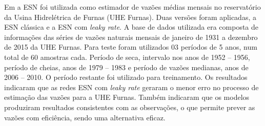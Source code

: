 
Em  a ESN foi utilizada como estimador de vazões médias mensais no reservatório da Usina Hidrelétrica de Furnas (UHE Furnas). Duas versões foram aplicadas, a ESN clássica e a ESN com \textit{leaky rate}. A base de dados utilizada era composta de informações das séries de vazões naturais mensais de janeiro de 1931 a dezembro de 2015 da UHE Furnas. Para teste foram utilizados 03 períodos de 5 anos, num total de 60 amostras cada. Período de seca, intervalo nos anos de 1952 -- 1956, período de cheias, anos de 1979 -- 1983 e período de vazões medianas, anos de 2006 -- 2010. O período restante foi utilizado para treinamento. Os resultados indicaram que as redes ESN com \textit{leaky rate} geraram o menor erro no processo de estimação das vazões para a UHE Furnas. Também indicaram que os modelos produziram resultados consistentes com as observações, o que permite prever as vazões com eficiência, sendo uma alternativa eficaz.
